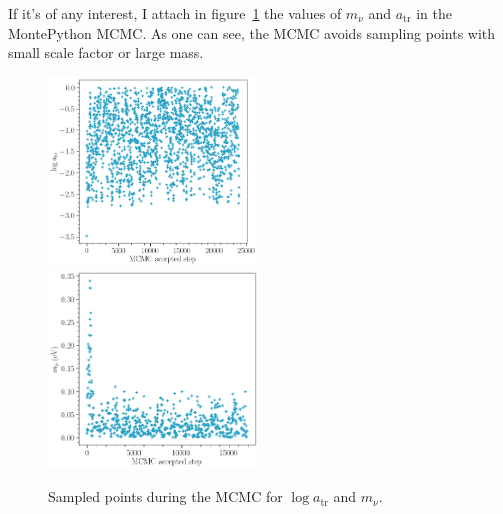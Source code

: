 If it's of any interest, I attach in figure~\ref{fig:mcmc-points} the values of $m_\nu$ and $a_{\mathrm{tr}}$ in the MontePython MCMC. As one can see, the MCMC avoids sampling points with small scale factor or large mass.
\begin{figure}
    \centering
    \includegraphics[width = 0.495\textwidth]{"Figures/mcmc-onestep.png"}
    \includegraphics[width = 0.495\textwidth]{"Figures/mcmc-mass.png"}
    \caption{Sampled points during the MCMC for $\log a_{\mathrm{tr}}$ and $m_\nu$.}
    \label{fig:mcmc-points}
\end{figure}
